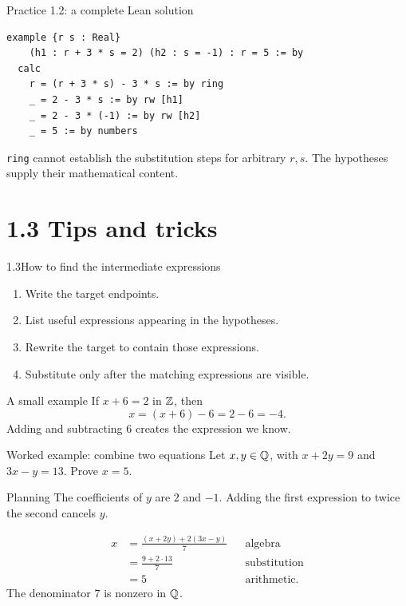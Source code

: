 \begin{frame}[fragile]{Practice 1.2: a complete Lean solution}
\begin{lstlisting}
example {r s : Real}
    (h1 : r + 3 * s = 2) (h2 : s = -1) : r = 5 := by
  calc
    r = (r + 3 * s) - 3 * s := by ring
    _ = 2 - 3 * s := by rw [h1]
    _ = 2 - 3 * (-1) := by rw [h2]
    _ = 5 := by numbers
\end{lstlisting}
\texttt{ring} cannot establish the substitution steps for arbitrary $r,s$.
The hypotheses supply their mathematical content.
\end{frame}

\section{1.3 Tips and tricks}
\begin{frame}{1.3\quad How to find the intermediate expressions}
\begin{enumerate}
\item Write the target endpoints.
\item List useful expressions appearing in the hypotheses.
\item Rewrite the target to contain those expressions.
\item Substitute only after the matching expressions are visible.
\end{enumerate}
\begin{exampleblock}{A small example}
If $x+6=2$ in $\mathbb{Z}$, then
\[
x=(x+6)-6=2-6=-4.
\]
Adding and subtracting $6$ creates the expression we know.
\end{exampleblock}
\end{frame}

\begin{frame}{Worked example: combine two equations}
Let $x,y\in\mathbb{Q}$, with $x+2y=9$ and $3x-y=13$. Prove $x=5$.
\begin{block}{Planning}
The coefficients of $y$ are $2$ and $-1$.
Adding the first expression to twice the second cancels $y$.
\end{block}
\[
\begin{aligned}
x&=\frac{(x+2y)+2(3x-y)}7&&\text{algebra}\\
 &=\frac{9+2\cdot13}7&&\text{substitution}\\
 &=5&&\text{arithmetic}.
\end{aligned}
\]
The denominator $7$ is nonzero in $\mathbb{Q}$.
\end{frame}

